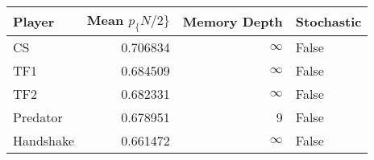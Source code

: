 \begin{tabular}{lrrl}
\toprule
    Player &  Mean $p_\{N/2\}$ &  Memory Depth & Stochastic \\
\midrule
        CS &        0.706834 &            \(\infty\) &      False \\
       TF1 &        0.684509 &            \(\infty\) &      False \\
       TF2 &        0.682331 &            \(\infty\) &      False \\
  Predator &        0.678951 &             9 &      False \\
 Handshake &        0.661472 &            \(\infty\) &      False \\
\bottomrule
\end{tabular}
